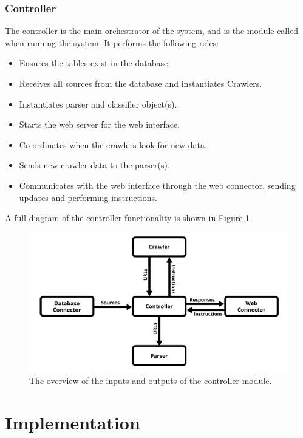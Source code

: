 \documentclass{l4proj}
\begin{document}
\subsection{Controller}
The controller is the main orchestrator of the system, and is the module called when running the system. It performs the following roles:
\begin{itemize}
    \item Ensures the tables exist in the database.
    \item Receives all sources from the database and instantiates Crawlers.
    \item Instantiates parser and classifier object(s).
    \item Starts the web server for the web interface.
    \item Co-ordinates when the crawlers look for new data.
    \item Sends new crawler data to the parser(s).
    \item Communicates with the web interface through the web connector, sending updates and performing instructions.
\end{itemize}
A full diagram of the controller functionality is shown in Figure \ref{fig:controller_diagram}
 \begin{figure}[h]
\centering
\includegraphics[width=\textwidth]{images/Controller-diagram.png}
\caption{The overview of the inputs and outputs of the controller module.}
\label{fig:controller_diagram}
\end{figure}

\chapter{Implementation}
\end{document}
